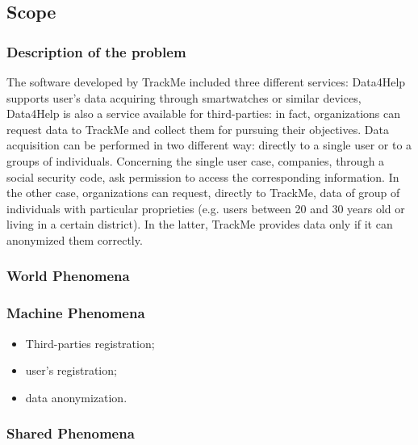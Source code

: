 \documentclass{article}
\begin{document}
\subsection{Scope}
\subsubsection{Description of the problem}
The software developed by TrackMe included three different services: Data4Help supports user's data acquiring through smartwatches or similar devices, 
Data4Help is also a service available for third-parties: in fact, organizations can request data to TrackMe and collect them for pursuing their objectives.
Data acquisition can be performed in two different way: directly to a single user or to a groups of individuals.
Concerning the single user case, companies, through a social security code, ask permission to access the corresponding information. 
In the other case, organizations can request, directly to TrackMe, data of group of individuals with particular proprieties (e.g. users between 20 and 30 years old or living in a certain district).
In the latter, TrackMe provides data only if it can anonymized them correctly. 



\subsubsection{World Phenomena}


\subsubsection{Machine Phenomena}
\begin{itemize}
\item Third-parties registration;
\item user's registration;
\item data anonymization.
\end{itemize}

\subsubsection{Shared Phenomena}
\end{document}
